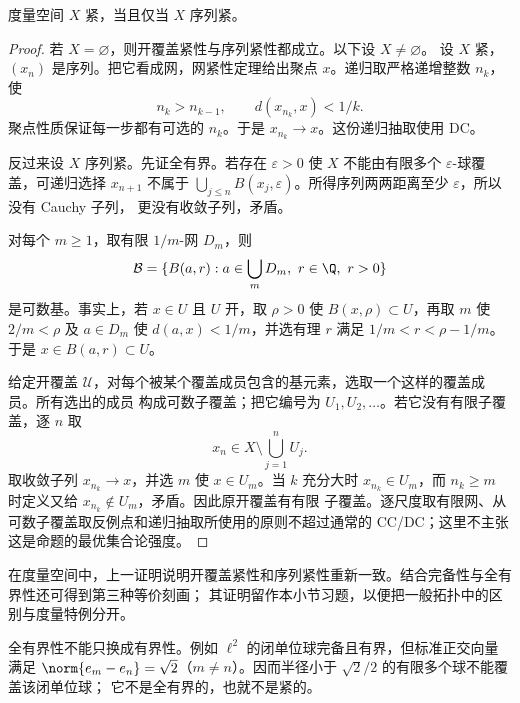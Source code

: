 \begin{theorem}[度量空间中的序列判别]\label{theorem:1-2-1-4}
度量空间 \(X\) 紧，当且仅当 \(X\) 序列紧。
\end{theorem}
\begin{proof}
若 \(X=\varnothing\)，则开覆盖紧性与序列紧性都成立。以下设 \(X\ne\varnothing\)。
设 \(X\) 紧，\((x_n)\) 是序列。把它看成网，网紧性定理给出聚点 \(x\)。递归取严格递增整数 \(n_k\)，使
\[
 n_k>n_{k-1},\qquad d(x_{n_k},x)<1/k.
\]
聚点性质保证每一步都有可选的 \(n_k\)。于是 \(x_{n_k}\to x\)。这份递归抽取使用 \textsf{DC}。

反过来设 \(X\) 序列紧。先证全有界。若存在 \(\varepsilon>0\) 使 \(X\) 不能由有限多个
\(\varepsilon\)-球覆盖，可递归选择 \(x_{n+1}\) 不属于
\(\bigcup_{j\le n}B(x_j,\varepsilon)\)。所得序列两两距离至少 \(\varepsilon\)，所以没有 Cauchy 子列，
更没有收敛子列，矛盾。

对每个 \(m\ge1\)，取有限 \(1/m\)-网 \(D_m\)，则
\[
 \mathcal B=\{B(a,r):a\in\bigcup_mD_m,\ r\in\Q,\ r>0\}
\]
是可数基。事实上，若 \(x\in U\) 且 \(U\) 开，取 \(\rho>0\) 使 \(B(x,\rho)\subset U\)，再取
\(m\) 使 \(2/m<\rho\) 及 \(a\in D_m\) 使 \(d(a,x)<1/m\)，并选有理
\(r\) 满足 \(1/m<r<\rho-1/m\)。于是 \(x\in B(a,r)\subset U\)。

给定开覆盖 \(\mathscr U\)，对每个被某个覆盖成员包含的基元素，选取一个这样的覆盖成员。所有选出的成员
构成可数子覆盖；把它编号为 \(U_1,U_2,\ldots\)。若它没有有限子覆盖，逐 \(n\) 取
\[
 x_n\in X\setminus\bigcup_{j=1}^nU_j.
\]
取收敛子列 \(x_{n_k}\to x\)，并选 \(m\) 使 \(x\in U_m\)。当 \(k\) 充分大时
\(x_{n_k}\in U_m\)，而 \(n_k\ge m\) 时定义又给 \(x_{n_k}\notin U_m\)，矛盾。因此原开覆盖有有限
子覆盖。逐尺度取有限网、从可数子覆盖取反例点和递归抽取所使用的原则不超过通常的
\textsf{CC}/\textsf{DC}；这里不主张这是命题的最优集合论强度。
\end{proof}

\begin{example}[紧性、序列紧性与全有界性]\label{ex:1-2-1-3}
在度量空间中，上一证明说明开覆盖紧性和序列紧性重新一致。结合完备性与全有界性还可得到第三种等价刻画；
其证明留作本小节习题，以便把一般拓扑中的区别与度量特例分开。

全有界性不能只换成有界性。例如 \(\ell^2\) 的闭单位球完备且有界，但标准正交向量满足
\(\norm{e_m-e_n}=\sqrt2\)（\(m\ne n\)）。因而半径小于 \(\sqrt2/2\) 的有限多个球不能覆盖该闭单位球；
它不是全有界的，也就不是紧的。
\end{example}

